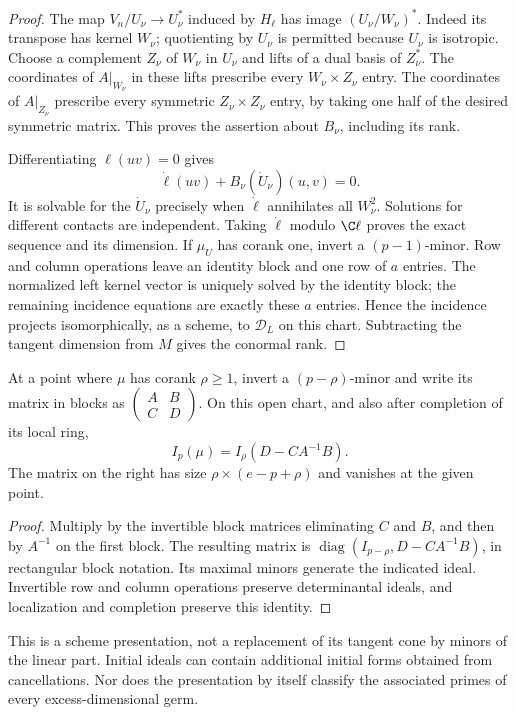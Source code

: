 \begin{proof}
The map $V_n/U_\nu\longrightarrow U_\nu^*$ induced by $H_\ell$ has
image $(U_\nu/W_\nu)^*$. Indeed its transpose has kernel $W_\nu$;
quotienting by $U_\nu$ is permitted because $U_\nu$ is isotropic.
Choose a complement $Z_\nu$ of $W_\nu$ in $U_\nu$ and lifts of a dual
basis of $Z_\nu^*$. The coordinates of $A|_{W_\nu}$ in these lifts
prescribe every $W_\nu\times Z_\nu$ entry. The coordinates of
$A|_{Z_\nu}$ prescribe every symmetric $Z_\nu\times Z_\nu$ entry,
by taking one half of the desired symmetric matrix. This proves the
assertion about $B_\nu$, including its rank.

Differentiating $\ell(uv)=0$ gives
\[
 \dot\ell(uv)+B_\nu(\dot U_\nu)(u,v)=0.
\]
It is solvable for the $\dot U_\nu$ precisely when $\dot\ell$ annihilates
all $W_\nu^2$. Solutions for different contacts are independent. Taking
$\dot\ell$ modulo $\C\ell$ proves the exact sequence and its dimension.
If $\mu_U$ has corank one, invert a $(p-1)$-minor. Row and column
operations leave an identity block and one row of $a$ entries. The
normalized left kernel vector is uniquely solved by the identity block;
the remaining incidence equations are exactly these $a$ entries. Hence
the incidence projects isomorphically, as a scheme, to $\mathscr D_L$
on this chart. Subtracting the tangent dimension from $M$ gives the
conormal rank.
\end{proof}

\begin{proposition}\label{prop:all-corank-schur}
At a point where $\mu$ has corank $\rho\ge1$, invert a
$(p-\rho)$-minor and write its matrix in blocks as
$\left(\begin{smallmatrix}A&B\\ C&D\end{smallmatrix}\right)$.
On this open chart, and also after completion of its local ring,
\begin{equation}\label{eq:all-corank-schur}
 I_p(\mu)=I_\rho(D-CA^{-1}B).
\end{equation}
The matrix on the right has size $\rho\times(e-p+\rho)$ and vanishes
at the given point.
\end{proposition}
\begin{proof}
Multiply by the invertible block matrices eliminating $C$ and $B$, and
then by $A^{-1}$ on the first block. The resulting matrix is
$\operatorname{diag}(I_{p-\rho},D-CA^{-1}B)$, in rectangular block
notation. Its maximal minors generate the indicated ideal. Invertible
row and column operations preserve determinantal ideals, and localization
and completion preserve this identity.
\end{proof}
This is a scheme presentation, not a replacement of its tangent cone by
minors of the linear part. Initial ideals can contain additional initial
forms obtained from cancellations. Nor does the presentation by itself
classify the associated primes of every excess-dimensional germ.

